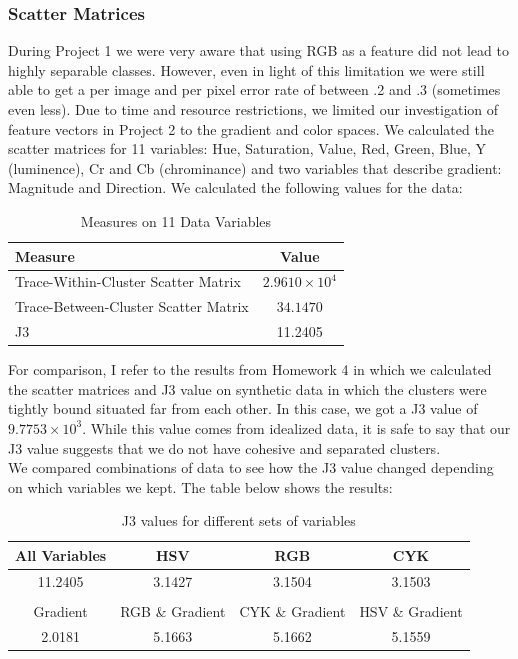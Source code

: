 \documentclass[12pt]{article}
\begin{document}
	\subsubsection{Scatter Matrices}
	During Project 1 we were very aware that using RGB as a feature did not lead to highly separable classes. However, even in light of this limitation we were still able to get a per image and per pixel error rate of between .2 and .3 (sometimes even less). Due to time and resource restrictions, we limited our investigation of feature vectors in Project 2 to the gradient and color spaces. 
	We calculated the scatter matrices for 11 variables: Hue, Saturation, Value, Red, Green, Blue, Y (luminence), Cr and Cb (chrominance) and two variables that describe gradient: Magnitude and Direction. 
	We calculated the following values for the data:
	\begin{table}[h]
		\centering
		\begin{tabular}{|l|c|}
		\hline
		Measure & Value\\
		\hline
		Trace-Within-Cluster Scatter Matrix & $2.9610 \times 10^4$\\
		Trace-Between-Cluster Scatter Matrix & $34.1470$\\
		J3 & 11.2405\\
		\hline
		\end{tabular}
		\caption{Measures on 11 Data Variables}
	\end{table}
	For comparison, I refer to the results from Homework 4 in which we calculated the scatter matrices and J3 value on synthetic data in which the clusters were tightly bound situated far from each other. In this case, we got a J3 value of $9.7753 \times 10^3$. While this value comes from idealized data, it is safe to say that our J3 value suggests that we do not have cohesive and separated clusters.\\
	We compared combinations of data to see how the J3 value changed depending on which variables we kept. The table below shows the results:\\
	\begin{table}[h]
		\centering
		\begin{tabular}{|c|c|c|c|}
			\hline
			All Variables & HSV & RGB & CYK\\
			\hline
			\hline
			11.2405 & 3.1427 & 3.1504 & 3.1503\\
			& & &\\
			\hline
			Gradient & RGB \& Gradient & CYK \& Gradient & HSV \& Gradient\\	
			\hline
			\hline
			2.0181 & 5.1663 & 5.1662 & 5.1559	\\
			\hline
		\end{tabular}
		\caption{J3 values for different sets of variables}
	\end{table}
\end{document}
